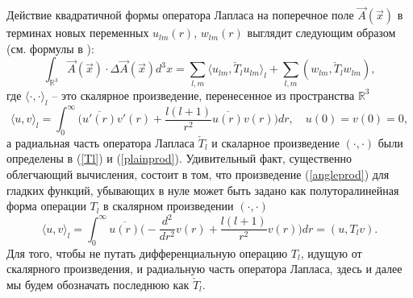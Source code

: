 \documentclass[12pt]{article}
\newcommand{\ol}{\overline}
\newcommand{\RR}{\mathbb{R}}
\begin{document}
    Действие квадратичной формы оператора Лапласа на поперечное поле
$ \vec{A}(\vec{x}) $
    в терминах новых переменных
$ u_{lm}(r) $,
$ w_{lm}(r) $
    выглядит следующим образом (см. формулы в
\cite{Lapl}):
\begin{equation*}
    \int_{\RR^{3}}\vec{A}(\vec{x})\cdot \Delta \vec{A}(\vec{x}) d^{3}x
	= \sum_{l,m}\langle u_{lm},\check{T}_{l}u_{lm}\rangle_{l}
	    + \sum_{l,m}(w_{lm},\check{T}_{l}w_{lm}) ,
\end{equation*}
    где
$ \langle \cdot , \cdot \rangle_{l} $
    -- это скалярное произведение, перенесенное из пространства
$ \RR^{3} $
\begin{equation}
\label{angleprod}
    \langle u, v\rangle_{l} = \int_{0}^{\infty} \bigl(
	\ol{u'(r)}v'(r) + \frac{l(l+1)}{r^{2}} \ol{u(r)}v(r)\bigr) dr ,
    \quad u(0) = v(0) = 0,
\end{equation}
    а радиальная часть оператора Лапласа
$ \check{T}_{l} $
    и скаларное произведение
$ (\cdot,\cdot) $
    были определены в
(\ref{Tl}) и
(\ref{plainprod}).
    Удивительный факт, существенно облегчающий вычисления, состоит в том,
    что произведение
(\ref{angleprod})
    для гладких функций, убывающих в нуле может быть задано как
    полуторалинейная форма операции
$ T_{l} $
    в скалярном произведении
$ (\cdot,\cdot) $
\begin{equation}
\label{Tprod}
    \langle u,v\rangle_{l} = \int_{0}^{\infty} \ol{u(r)} \bigl(
	-\frac{d^{2}}{dr^{2}}v(r) + \frac{l(l+1)}{r^{2}}v(r) \bigr) dr
	= (u, T_{l}v).
\end{equation}
    Для того, чтобы не путать дифференциальную операцию
$ T_{l} $,
    идущую от скалярного произведения, и радиальную часть оператора
    Лапласа, здесь и далее мы будем обозначать последнюю как
$ \check{T}_{l} $.
\end{document}
